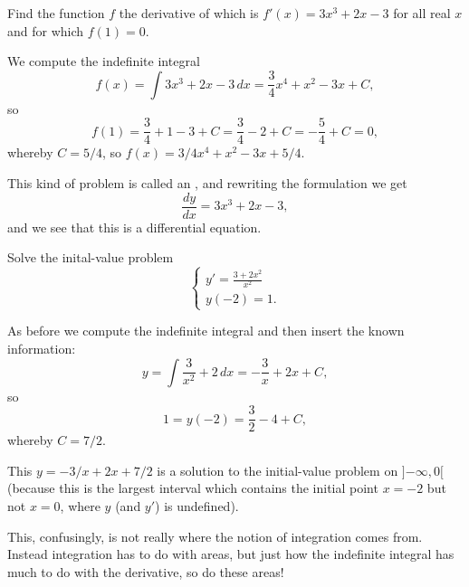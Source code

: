 \begin{example}
	Find the function $f$ the derivative of which is $f'(x) = 3 x^3 + 2 x - 3$ for all real $x$ and for which $f(1) = 0$.

	We compute the indefinite integral
	\[
		f(x) = \int 3 x^3 + 2 x - 3 \, d x = \frac{3}{4} x^4 + x^2 - 3 x + C,
	\]
	so
	\[
		f(1) = \frac{3}{4} + 1 - 3 + C = \frac{3}{4} - 2 + C = - \frac{5}{4} + C = 0,
	\]
	whereby $C = 5/4$, so $f(x) = 3/4 x^4 + x^2 - 3 x + 5/4$.
\end{example}

\noindent
This kind of problem is called an , and rewriting the formulation we get
\[
	\frac{d y}{d x} = 3 x^3 + 2 x - 3,
\]
and we see that this is a differential equation.

\begin{example}
	Solve the inital-value problem
	\[
		\begin{cases}
			y' = \frac{3 + 2 x^2}{x^2} \\
			y(-2) = 1.
		\end{cases}
	\]

	\noindent
	As before we compute the indefinite integral and then insert the known information:
	\[
		y = \int \frac{3}{x^2} + 2 \, d x = - \frac{3}{x} + 2 x + C,
	\]
	so
	\[
		1 = y(-2) = \frac{3}{2} - 4 + C,
	\]
	whereby $C = 7/2$.

	This $y = -3 / x + 2 x + 7/2$ is a solution to the initial-value problem on ${]{-\infty, 0}[}$ (because this is the largest interval which contains the initial point $x = -2$ but not $x = 0$, where $y$ (and $y'$) is undefined).
\end{example}

\noindent
This, confusingly, is not really where the notion of integration comes from. Instead integration has to do with areas, but just how the indefinite integral has much to do with the derivative, so do these areas!
